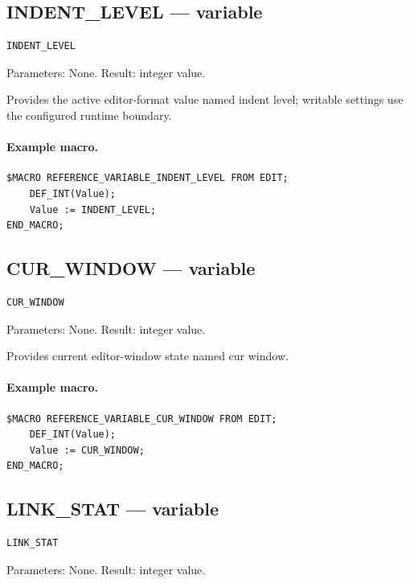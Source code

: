 \documentclass[a4paper,10pt,twoside,openany]{book}
\begin{document}
\label{prim:variable-indent-level}
\subsection*{INDENT\_LEVEL --- variable}
\begin{verbatim}
INDENT_LEVEL
\end{verbatim}
Parameters: None. Result: integer value.

Provides the active editor-format value named indent level; writable settings use the configured runtime boundary.

\paragraph{Example macro.}
\begin{verbatim}
$MACRO REFERENCE_VARIABLE_INDENT_LEVEL FROM EDIT;
    DEF_INT(Value);
    Value := INDENT_LEVEL;
END_MACRO;
\end{verbatim}

\label{prim:variable-cur-window}
\subsection*{CUR\_WINDOW --- variable}
\begin{verbatim}
CUR_WINDOW
\end{verbatim}
Parameters: None. Result: integer value.

Provides current editor-window state named cur window.

\paragraph{Example macro.}
\begin{verbatim}
$MACRO REFERENCE_VARIABLE_CUR_WINDOW FROM EDIT;
    DEF_INT(Value);
    Value := CUR_WINDOW;
END_MACRO;
\end{verbatim}

\label{prim:variable-link-stat}
\subsection*{LINK\_STAT --- variable}
\begin{verbatim}
LINK_STAT
\end{verbatim}
Parameters: None. Result: integer value.
\end{document}
